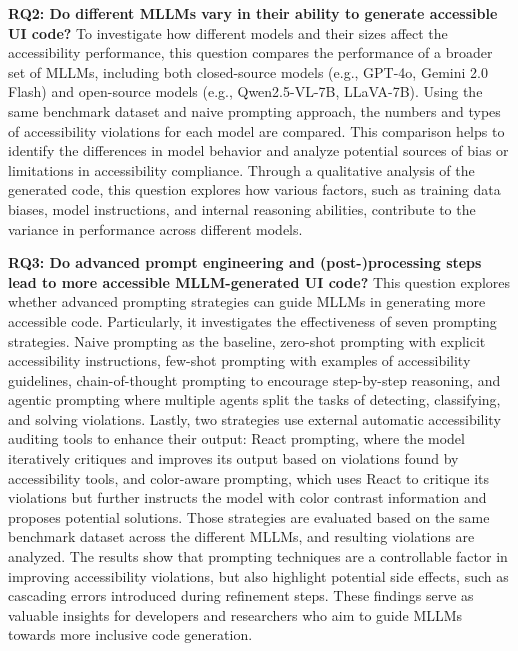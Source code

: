 \textbf{RQ2: Do different MLLMs vary in their ability to generate accessible UI code?}
To investigate how different models and their sizes affect the 
accessibility performance, this question compares the performance of 
a broader set of MLLMs, including both closed-source models
(e.g., GPT-4o, Gemini 2.0 Flash) and open-source
models (e.g., Qwen2.5-VL-7B, LLaVA-7B). Using the same benchmark dataset and 
naive prompting approach, the numbers and types of accessibility 
violations for each model are compared. This comparison helps to
identify the differences in model behavior and analyze potential 
sources of bias or limitations in accessibility compliance. 
Through a qualitative analysis of the generated code, this question 
explores how various factors, such as training data biases, model instructions, and
internal reasoning abilities, contribute to the variance in
performance across different models.
\newline

\textbf{RQ3: Do advanced prompt engineering and (post-)processing steps lead to more accessible MLLM-generated UI
code?}
This question explores whether advanced prompting strategies can guide 
MLLMs in generating more accessible code. Particularly, it investigates
the effectiveness of seven prompting strategies. Naive prompting as the
baseline, zero-shot prompting with explicit accessibility instructions,
few-shot prompting with examples of accessibility guidelines,
chain-of-thought prompting to encourage step-by-step reasoning, and
agentic prompting where multiple agents split the tasks of
detecting, classifying, and solving violations. 
Lastly, two strategies use external automatic accessibility auditing tools to enhance their output:
React prompting, where the model iteratively critiques and improves 
its output based on violations found by accessibility tools, 
and color-aware prompting, which uses React to critique its violations but 
further instructs the model with color contrast information and proposes
potential solutions. Those strategies are evaluated based on the same 
benchmark dataset across the different MLLMs, and resulting violations 
are analyzed. 
The results show that prompting techniques are a controllable
factor in improving accessibility violations, but also highlight
potential side effects, such as cascading
errors introduced during refinement steps.
These findings serve as valuable insights for developers and researchers
who aim to guide MLLMs towards more inclusive code generation.\newline


